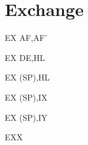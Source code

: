 \section{Exchange}

\begin{minipage}{\textwidth}
	
\begin{instrtable}	

    \begin{instruction}{EX AF,AF'} 
            \FlagsEXaf
    \end{instruction}

    \begin{instruction}{EX DE,HL} 
            \FlagsEXrr
    \end{instruction}

    \begin{instruction}{EX (SP),HL} 
            \FlagsEXrr
        \SkipToSymbol 
    \end{instruction}

    \begin{instruction}{EX (SP),IX} 
            \FlagsEXrr
        \SkipToSymbol
            \FromSymbolToOpCode
    \end{instruction}

    \begin{instruction}{EX (SP),IY} 
            \FlagsEXrr
        \SkipToSymbol
            \FromSymbolToOpCode
    \end{instruction}

    \begin{lastinstruction}{EXX} 
        \Symbol{\SymEXX[0]}
            \FlagsEXX
        \SkipToSymbol
            \Symbol{\SymEXX[1]}
        \SkipToSymbol
            \Symbol{\SymEXX[2]}
    \end{lastinstruction}
	
\end{instrtable}

\NoteTableSingleItemSpaceCorrection

\begin{notestable}
\end{notestable}

\end{minipage}